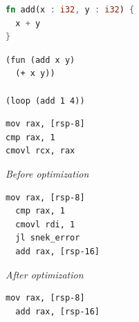 \documentclass{article}
\begin{document}



\begin{lstlisting}[language=Rust]
fn add(x : i32, y : i32) {
  x + y
}
\end{lstlisting}


\begin{lstlisting}[language=LISP]
(fun (add x y)
  (+ x y))

(loop (add 1 4))
\end{lstlisting}


\begin{lstlisting}[language={[x86masm]Assembler}]
mov rax, [rsp-8]
cmp rax, 1
cmovl rcx, rax
\end{lstlisting}


\begin{minipage}[t]{0.4\textwidth}
  {\it Before optimization}
  \begin{lstlisting}[language={[x86masm]Assembler}]
  mov rax, [rsp-8]
  cmp rax, 1
  cmovl rdi, 1
  jl snek_error
  add rax, [rsp-16]
  \end{lstlisting}
\end{minipage}
\begin{minipage}[t]{0.4\textwidth}
  {\it After optimization}
  \begin{lstlisting}[language={[x86masm]Assembler}]
  mov rax, [rsp-8]
  add rax, [rsp-16]
  \end{lstlisting}
\end{minipage}
\end{document}
